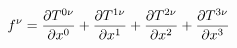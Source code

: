 \documentclass[preview]{standalone}
\begin{document}
\begin{align*}
\special{dvisvgm:raw <g id='unique000'>}f^\nu = \frac{\partial T^{0\nu}}{\partial x^0} + \frac{\partial T^{1\nu}}{\partial x^1} + \frac{\partial T^{2\nu}}{\partial x^2} + \frac{\partial T^{3\nu}}{\partial x^3}\special{dvisvgm:raw </g>}
\end{align*}
\end{document}
